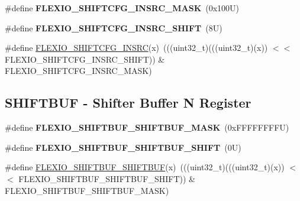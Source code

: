 \begin{DoxyCompactItemize}
\mbox{\label{group___f_l_e_x_i_o___register___masks_gad4a4fc0ab67fa28942778512f5dbd6f7}} 
\#define {\bfseries F\+L\+E\+X\+I\+O\+\_\+\+S\+H\+I\+F\+T\+C\+F\+G\+\_\+\+I\+N\+S\+R\+C\+\_\+\+M\+A\+SK}~(0x100\+U)
\item 
\mbox{\label{group___f_l_e_x_i_o___register___masks_gae81003ee59049d7e25089e2ffe1deb78}} 
\#define {\bfseries F\+L\+E\+X\+I\+O\+\_\+\+S\+H\+I\+F\+T\+C\+F\+G\+\_\+\+I\+N\+S\+R\+C\+\_\+\+S\+H\+I\+FT}~(8\+U)
\item 
\#define \mbox{\hyperlink{group___f_l_e_x_i_o___register___masks_ga927d4f71122eccb7f1fdabb38fb35ddb}{F\+L\+E\+X\+I\+O\+\_\+\+S\+H\+I\+F\+T\+C\+F\+G\+\_\+\+I\+N\+S\+RC}}(x)~(((uint32\+\_\+t)(((uint32\+\_\+t)(x)) $<$$<$ F\+L\+E\+X\+I\+O\+\_\+\+S\+H\+I\+F\+T\+C\+F\+G\+\_\+\+I\+N\+S\+R\+C\+\_\+\+S\+H\+I\+FT)) \& F\+L\+E\+X\+I\+O\+\_\+\+S\+H\+I\+F\+T\+C\+F\+G\+\_\+\+I\+N\+S\+R\+C\+\_\+\+M\+A\+SK)
\end{DoxyCompactItemize}
\subsection*{S\+H\+I\+F\+T\+B\+UF -\/ Shifter Buffer N Register}
\begin{DoxyCompactItemize}
\item 
\mbox{\label{group___f_l_e_x_i_o___register___masks_ga19eea38360ded5fa83ca347257dba8ab}} 
\#define {\bfseries F\+L\+E\+X\+I\+O\+\_\+\+S\+H\+I\+F\+T\+B\+U\+F\+\_\+\+S\+H\+I\+F\+T\+B\+U\+F\+\_\+\+M\+A\+SK}~(0x\+F\+F\+F\+F\+F\+F\+F\+F\+U)
\item 
\mbox{\label{group___f_l_e_x_i_o___register___masks_gac991735daf06773eb94b90343cb72341}} 
\#define {\bfseries F\+L\+E\+X\+I\+O\+\_\+\+S\+H\+I\+F\+T\+B\+U\+F\+\_\+\+S\+H\+I\+F\+T\+B\+U\+F\+\_\+\+S\+H\+I\+FT}~(0\+U)
\item 
\#define \mbox{\hyperlink{group___f_l_e_x_i_o___register___masks_ga46ef95e18ad969c44be0eed73ff4d60c}{F\+L\+E\+X\+I\+O\+\_\+\+S\+H\+I\+F\+T\+B\+U\+F\+\_\+\+S\+H\+I\+F\+T\+B\+UF}}(x)~(((uint32\+\_\+t)(((uint32\+\_\+t)(x)) $<$$<$ F\+L\+E\+X\+I\+O\+\_\+\+S\+H\+I\+F\+T\+B\+U\+F\+\_\+\+S\+H\+I\+F\+T\+B\+U\+F\+\_\+\+S\+H\+I\+FT)) \& F\+L\+E\+X\+I\+O\+\_\+\+S\+H\+I\+F\+T\+B\+U\+F\+\_\+\+S\+H\+I\+F\+T\+B\+U\+F\+\_\+\+M\+A\+SK)
\end{DoxyCompactItemize}
